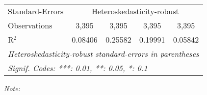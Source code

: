 \begin{table}[htbp!]
\begin{adjustbox}{width = 1\textwidth, max height = 0.95\textheight, center}
\begin{threeparttable}[b]
\begin{tabular}{lcccc}
            \midrule 
            Standard-Errors & \multicolumn{4}{c}{Heteroskedasticity-robust} \\ 
            Observations         & 3,395                          & 3,395                          & 3,395                           & 3,395\\  
            R$^2$                & 0.08406                        & 0.25582                        & 0.19991                         & 0.05842\\  
            \midrule \midrule
            \multicolumn{5}{l}{\emph{Heteroskedasticity-robust standard-errors in parentheses}}\\
            \multicolumn{5}{l}{\emph{Signif. Codes: ***: 0.01, **: 0.05, *: 0.1}}\\
         \end{tabular}
         
         \begin{tablenotes}\item \medskip \textit{Note:}
         \end{tablenotes}
      \end{threeparttable}
   \end{adjustbox}
\end{table}


